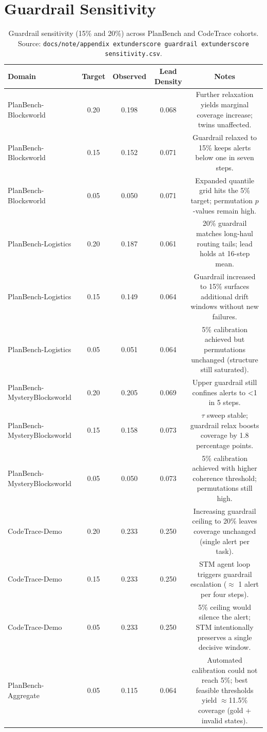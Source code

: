 \documentclass[11pt]{article}
\begin{document}
\section{Guardrail Sensitivity}
\label{app:guardrail}
\begin{table}[h]
  \centering
  \caption{Guardrail sensitivity (15\% and 20\%) across PlanBench and CodeTrace cohorts. Source: \texttt{docs/note/appendix	extunderscore guardrail	extunderscore sensitivity.csv}.}
  \begin{tabular}{lcccc}
    \hline
    Domain & Target & Observed & Lead Density & Notes\\
    \hline
    PlanBench-Blocksworld & 0.20 & 0.198 & 0.068 & Further relaxation yields marginal coverage increase; twins unaffected.\\
    PlanBench-Blocksworld & 0.15 & 0.152 & 0.071 & Guardrail relaxed to 15\% keeps alerts below one in seven steps.\\
    PlanBench-Blocksworld & 0.05 & 0.050 & 0.071 & Expanded quantile grid hits the 5\% target; permutation $p$-values remain high.\\
    PlanBench-Logistics & 0.20 & 0.187 & 0.061 & 20\% guardrail matches long-haul routing tails; lead holds at 16-step mean.\\
    PlanBench-Logistics & 0.15 & 0.149 & 0.064 & Guardrail increased to 15\% surfaces additional drift windows without new failures.\\
    PlanBench-Logistics & 0.05 & 0.051 & 0.064 & 5\% calibration achieved but permutations unchanged (structure still saturated).\\
    PlanBench-MysteryBlocksworld & 0.20 & 0.205 & 0.069 & Upper guardrail still confines alerts to <1 in 5 steps.\\
    PlanBench-MysteryBlocksworld & 0.15 & 0.158 & 0.073 & $\tau$ sweep stable; guardrail relax boosts coverage by 1.8 percentage points.\\
    PlanBench-MysteryBlocksworld & 0.05 & 0.050 & 0.073 & 5\% calibration achieved with higher coherence threshold; permutations still high.\\
    CodeTrace-Demo & 0.20 & 0.233 & 0.250 & Increasing guardrail ceiling to 20\% leaves coverage unchanged (single alert per task).\\
    CodeTrace-Demo & 0.15 & 0.233 & 0.250 & STM agent loop triggers guardrail escalation ($\approx$ 1 alert per four steps).\\
    CodeTrace-Demo & 0.05 & 0.233 & 0.250 & 5\% ceiling would silence the alert; STM intentionally preserves a single decisive window.\\
    PlanBench-Aggregate & 0.05 & 0.115 & 0.064 & Automated calibration could not reach 5\%; best feasible thresholds yield $\approx$11.5\% coverage (gold + invalid states).\\
    \hline
  \end{tabular}
\end{table}
\end{document}
